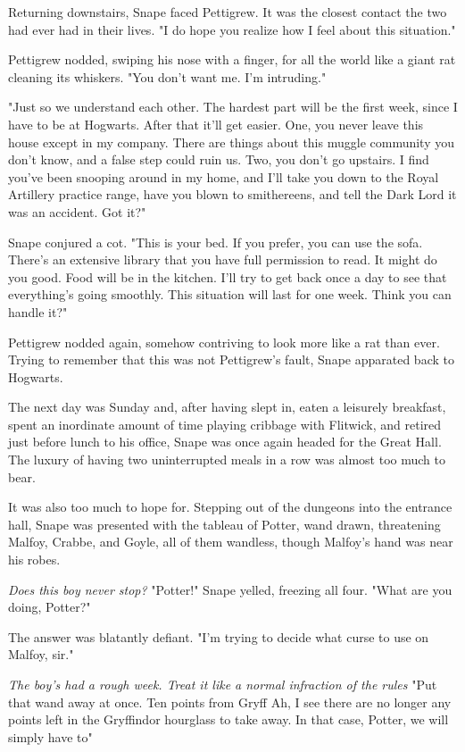 Returning downstairs, Snape faced Pettigrew. It was the closest contact the two had ever had in their lives. "I do hope you realize how I feel about this situation."

Pettigrew nodded, swiping his nose with a finger, for all the world like a giant rat cleaning its whiskers. "You don't want me. I'm intruding."

"Just so we understand each other. The hardest part will be the first week, since I have to be at Hogwarts. After that it'll get easier. One, you never leave this house except in my company. There are things about this muggle community you don't know, and a false step could ruin us. Two, you don't go upstairs. I find you've been snooping around in my home, and I'll take you down to the Royal Artillery practice range, have you blown to smithereens, and tell the Dark Lord it was an accident. Got it?"

Snape conjured a cot. "This is your bed. If you prefer, you can use the sofa. There's an extensive library that you have full permission to read. It might do you good. Food will be in the kitchen. I'll try to get back once a day to see that everything's going smoothly. This situation will last for one week. Think you can handle it?"

Pettigrew nodded again, somehow contriving to look more like a rat than ever. Trying to remember that this was not Pettigrew's fault, Snape apparated back to Hogwarts.

The next day was Sunday and, after having slept in, eaten a leisurely breakfast, spent an inordinate amount of time playing cribbage with Flitwick, and retired just before lunch to his office, Snape was once again headed for the Great Hall. The luxury of having two uninterrupted meals in a row was almost too much to bear.

It was also too much to hope for. Stepping out of the dungeons into the entrance hall, Snape was presented with the tableau of Potter, wand drawn, threatening Malfoy, Crabbe, and Goyle, all of them wandless, though Malfoy's hand was near his robes.

\emph{Does this boy never stop?} "Potter!" Snape yelled, freezing all four. "What are you doing, Potter?"

The answer was blatantly defiant. "I'm trying to decide what curse to use on Malfoy, sir."

\emph{The boy's had a rough week. Treat it like a normal infraction of the rules{\el}} "Put that wand away at once. Ten points from Gryff{\el} Ah, I see there are no longer any points left in the Gryffindor hourglass to take away. In that case, Potter, we will simply have to{\el}"

